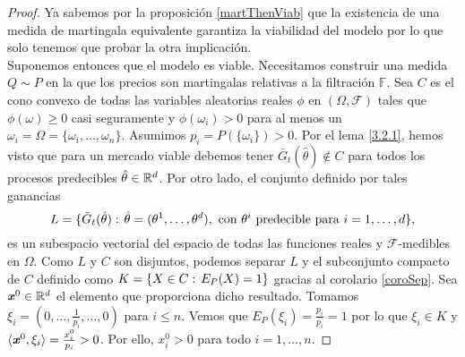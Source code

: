 \begin{proof}
	Ya sabemos por la proposición \ref{martThenViab} que la existencia de una medida de martingala equivalente garantiza la viabilidad del modelo por lo que solo tenemos que probar la otra implicación. \\
	
	Suponemos entonces que el modelo es viable. Necesitamos construir una medida $ Q \sim P $ en la que los precios son martingalas relativas a la filtración $ \mathbb{F} $. Sea $ C $ es el cono convexo de todas las variables aleatorias reales $ \phi $ en $ (\Omega, \mathcal{F}) $ tales que $ \phi(\omega) \geq 0 $ casi seguramente y $ \phi(\omega_i) > 0 $ para al menos un $ \omega_i = \Omega = \{\omega_i,\dots, \omega_n \} $. Asumimos $ p_i = P(\{\omega_i\}) > 0 $. Por el lema \ref{3.2.1}, hemos visto que para un mercado viable debemos tener $ \bar{G}_t(\hat{\theta}) \notin C$ para todos los procesos predecibles $ \hat{\theta} \in  \mathbb{R}^d $. Por otro lado, el conjunto definido por tales ganancias 
	\[
	L = \{\bar{G}_t(\hat{\theta}):\hspace{0.5mm} \hat{\theta}=(\theta^1,\dots,\theta^d),\text{ con } \theta^i \text{ predecible para } i=1,\dots,d \},
	\]
	es un subespacio vectorial del espacio de todas las funciones reales y  $ \mathcal{F} $-medibles en $ \Omega $. Como $ L $ y $ C $ son disjuntos, podemos separar $ L $ y el subconjunto compacto de $ C $ definido como $ K =\{X\in C: \hspace{0.5mm} E_P(X) = 1\} $ gracias al corolario \ref{coroSep}. Sea $ \textbf{\emph{x}}^0 \in \mathbb{R}^d $ el elemento que proporciona dicho resultado. Tomamos $ \xi_i = (0,\dots,\frac{1}{p_i},\dots,0) $ para $ i \leq n $. Vemos que $ E_P(\xi_i) = \frac{p_i}{p_i} = 1$ por lo que $ \xi_i \in K $ y $ \langle \textbf{\emph{x}}^0, \xi_i \rangle = \frac{x^0_i}{p_i} > 0$. Por ello, $ x^0_i > 0$ para todo $ i=1,\dots,n $.
	

\end{proof}
